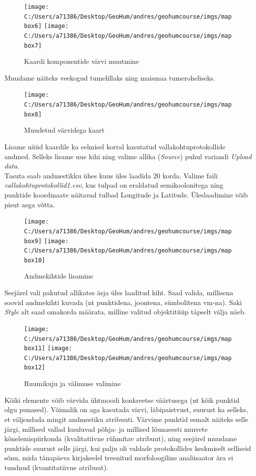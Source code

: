 \documentclass[
]{book}
\begin{document}
\begin{figure}
\texttt{[image: C:/Users/a71386/Desktop/GeoHum/andres/geohumcourse/imgs/mapbox6]} \texttt{[image: C:/Users/a71386/Desktop/GeoHum/andres/geohumcourse/imgs/mapbox7]} \caption{Kaardi komponentide värvi muutmine}\label{fig:mapbox4}
\end{figure}

Muudame näiteks veekogud tumelillaks ning maismaa tumeroheliseks.

\begin{figure}
\texttt{[image: C:/Users/a71386/Desktop/GeoHum/andres/geohumcourse/imgs/mapbox8]} \caption{Muudetud värvidega kaart}\label{fig:mapbox5}
\end{figure}

Lisame nüüd kaardile ka eelmisel korral kasutatud vallakohtuprotokollide andmed. Selleks lisame uue kihi ning valime allika (\emph{Source}) puhul variandi \emph{Upload data}.\\
Tasuta saab andmestikku ühes kuus üles laadida 20 korda. Valime faili \emph{vallakohtuprotokollid1.csv}, kus tulpad on eraldatud semikoolonitega ning punktide koordinaate näitavad tulbad Longitude ja Latitude. Üleslaadimine võib pisut aega võtta.

\begin{figure}
\texttt{[image: C:/Users/a71386/Desktop/GeoHum/andres/geohumcourse/imgs/mapbox9]} \texttt{[image: C:/Users/a71386/Desktop/GeoHum/andres/geohumcourse/imgs/mapbox10]} \caption{Andmekihtide lisamine}\label{fig:mapbox6}
\end{figure}

Seejärel vali pakutud allikates äsja üles laaditud kiht. Saad valida, millisena soovid andmekihti kuvada (nt punktidena, joontena, sümbolitena vm-na). Saki \emph{Style} alt saad omakorda määrata, milline valitud objektitüüp täpselt välja näeb.

\begin{figure}
\texttt{[image: C:/Users/a71386/Desktop/GeoHum/andres/geohumcourse/imgs/mapbox11]} \texttt{[image: C:/Users/a71386/Desktop/GeoHum/andres/geohumcourse/imgs/mapbox12]} \caption{Ruumikuju ja välimuse valimine}\label{fig:mapbox7}
\end{figure}

Kõiki elemente võib värvida ühtmoodi konkreetse väärtusega (nt kõik punktid olgu punased). Võimalik on aga kasutada värvi, läbipaistvust, suurust ka selleks, et väljendada mingit andmestiku atribuuti. Värvime punktid esmalt näiteks selle järgi, millised vallad kuuluvad põhja- ja millised lõunaeesti murrete kõnelemispiirkonda (kvalitatiivne rühmitav atribuut), ning seejärel muudame punktide suurust selle järgi, kui palju oli valdade protokollides keskmiselt selliseid sõnu, mida tänapäeva kirjakeelel treenitud morfoloogiline analüsaator ära ei tundnud (kvantitatiivne atribuut).
\end{document}
